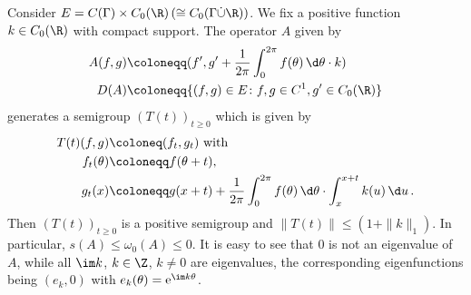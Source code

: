 \begin{example}\label{ex:b3-2.13}
	Consider $E = C(\Gamma) \times C_{0}(\R) \, (\cong C_{0}(\Gamma\dot{\cup}\R))$.
	We fix a positive function $k \in C_{0}(\R)$ with compact support.
	The operator $A$ given by
	\begin{equation}\label{eq:b3-2.20}
		\begin{aligned}
		A(f,g) &\coloneqq (f',g' + \frac{1}{2\pi}\int_{0}^{2\pi} f(\theta) \, \d\theta\cdot k) \\
		D(A) &\coloneqq \{(f,g) \in E \colon f,g \in C^{1}, g' \in C_{0}(\R)\}
		\end{aligned}
	\end{equation}
	generates a semigroup $(T(t))_{t \geq 0}$ which is given by
	\begin{equation}\label{eq:b3-2.21}
		\begin{aligned}
			T(t)(f,g) &\coloneq (f_{t},g_{t}) \text{ with }\\
		   f_{t}(\theta) &\coloneqq f(\theta+t), \\
			g_{t}(x) &\coloneqq g(x+t) + \frac{1}{2\pi}\int_{0}^{2\pi} f(\theta)\,\d\theta\cdot\int_{x}^{x+t} k(u) \, \d u\,.
		\end{aligned}
	\end{equation}
	Then $(T(t))_{t \geq 0}$ is a positive semigroup and $\|T(t)\| \leq (1 + \|k\|_{1})$.
	In particular, $s(A) \leq \omega_{0}(A) \leq 0$.
	It is easy to see that $0$ is not an eigenvalue of $A$, while all $\im k$, $k \in \Z$, $k \neq 0$ are eigenvalues, the corresponding eigenfunctions being $(e_{k},0)$ with $e_{k}(\theta) = \mathrm{e}^{\im k\theta}$.
\end{example}
%	
